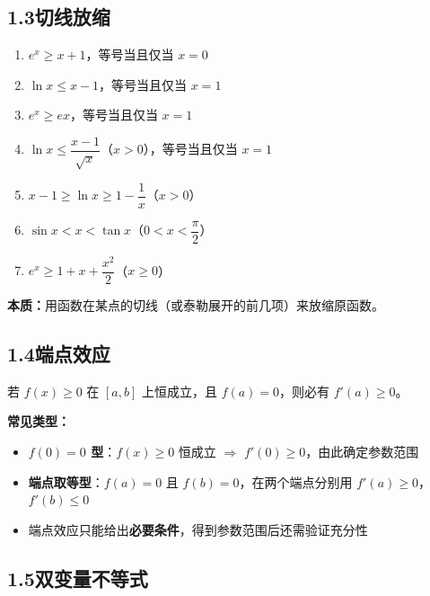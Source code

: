 \documentclass[12pt, a4paper]{ctexart}
\begin{document}
\subsection*{1.3\quad 切线放缩}

\begin{knowledgebox}[常用切线放缩公式]
\begin{enumerate}[leftmargin=2em]
  \item $e^x \geq x+1$，等号当且仅当 $x=0$
  \item $\ln x \leq x-1$，等号当且仅当 $x=1$
  \item $e^x \geq ex$，等号当且仅当 $x=1$
  \item $\ln x \leq \dfrac{x-1}{\sqrt{x}}$（$x>0$），等号当且仅当 $x=1$
  \item $x-1 \geq \ln x \geq 1-\dfrac{1}{x}$（$x>0$）
  \item $\sin x < x < \tan x$（$0<x<\dfrac{\pi}{2}$）
  \item $e^x \geq 1+x+\dfrac{x^2}{2}$（$x\geq 0$）
\end{enumerate}

\textbf{本质：}用函数在某点的切线（或泰勒展开的前几项）来放缩原函数。
\end{knowledgebox}

\subsection*{1.4\quad 端点效应}

\begin{knowledgebox}
若 $f(x)\geq 0$ 在 $[a,b]$ 上恒成立，且 $f(a)=0$，则必有 $f'(a)\geq 0$。

\textbf{常见类型：}
\begin{itemize}[leftmargin=2em]
  \item \textbf{$f(0)=0$ 型}：$f(x)\geq 0$ 恒成立 $\Rightarrow$ $f'(0)\geq 0$，由此确定参数范围
  \item \textbf{端点取等型}：$f(a)=0$ 且 $f(b)=0$，在两个端点分别用 $f'(a)\geq 0$，$f'(b)\leq 0$
  \item 端点效应只能给出\textbf{必要条件}，得到参数范围后还需验证充分性
\end{itemize}
\end{knowledgebox}

\subsection*{1.5\quad 双变量不等式}
\end{document}
